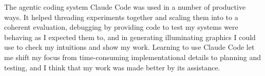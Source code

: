 \documentclass[thesis]{cluu}
\begin{document}
The agentic coding system Claude Code was used in a number of productive ways. It helped threading experiments together and scaling them into to a coherent evaluation, debugging by providing code to test my systems were behaving as I expected them to, and in generating illuminating graphics I could use to check my intuitions and show my work. Learning to use Claude Code let me shift my focus from time-consuming implementational details to planning and testing, and I think that my work was made better by its assistance.

\appendix
\printbibliography
\end{document}
